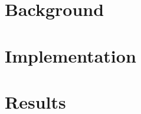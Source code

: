\documentclass{bmcart}
\begin{document}
\begin{frontmatter}
\begin{abstractbox}
\begin{keyword}
\end{keyword}


\end{abstractbox}
%

\end{frontmatter}




\section*{Background}


\section*{Implementation}


\section*{Results}

\end{document}
